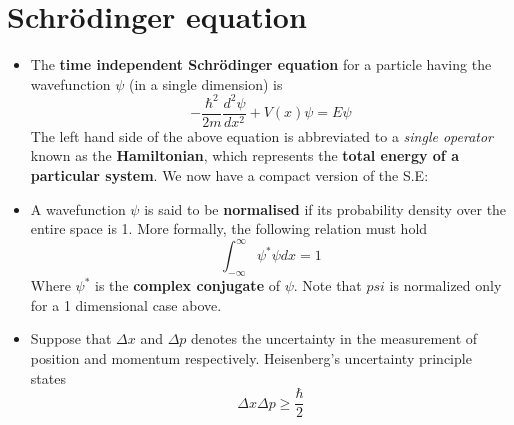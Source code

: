 \documentclass[a4paper]{article}
\begin{document}
\section{Schrödinger equation}
\begin{itemize}
    \item The \textbf{time independent Schrödinger equation} for a particle having the wavefunction $\psi$ (in a single dimension) is
    \begin{equation*}
        -\frac{\hbar^2}{2m}\frac{d^2\psi}{dx^2} + V(x)\psi = E\psi
    \end{equation*}
    The left hand side of the above equation is abbreviated to a \textit{single operator} known as the \textbf{Hamiltonian}, which represents the \textbf{total energy of a particular system}. We now have a compact version of the S.E: 
   
   \item A wavefunction $\psi$ is said to be \textbf{normalised} if its probability density over the entire space is 1. More formally, the following relation must hold
   \begin{equation*}
       \int_{-\infty}^{\infty}\psi^*\psi dx = 1 
   \end{equation*}
   Where $\psi^*$ is the \textbf{complex conjugate} of $\psi$. Note that $psi$ is normalized only for a 1 dimensional case above. 
   
   \item Suppose that $\Delta x$ and $\Delta p$ denotes the uncertainty in the measurement of position and momentum respectively. Heisenberg's uncertainty principle states
   \begin{equation*}
       \Delta x\Delta p\geq \frac{\hbar}{2}
   \end{equation*}
\end{itemize}
\end{document}
